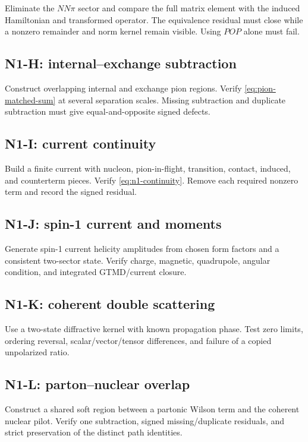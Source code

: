 \documentclass[11pt]{article}
\begin{document}
Eliminate the \(NN\pi\) sector and compare the full matrix element with the
induced Hamiltonian and transformed operator.  The equivalence residual must
close while a nonzero remainder and norm kernel remain visible.  Using
\(POP\) alone must fail.

\subsection{N1-H: internal--exchange subtraction}

Construct overlapping internal and exchange pion regions.  Verify
\cref{eq:pion-matched-sum} at several separation scales.  Missing subtraction
and duplicate subtraction must give equal-and-opposite signed defects.

\subsection{N1-I: current continuity}

Build a finite current with nucleon, pion-in-flight, transition, contact,
induced, and counterterm pieces.  Verify \cref{eq:n1-continuity}.  Remove each
required nonzero term and record the signed residual.

\subsection{N1-J: spin-1 current and moments}

Generate spin-1 current helicity amplitudes from chosen form factors and a
consistent two-sector state.  Verify charge, magnetic, quadrupole, angular
condition, and integrated GTMD/current closure.

\subsection{N1-K: coherent double scattering}

Use a two-state diffractive kernel with known propagation phase.  Test zero
limits, ordering reversal, scalar/vector/tensor differences, and failure of a
copied unpolarized ratio.

\subsection{N1-L: parton--nuclear overlap}

Construct a shared soft region between a partonic Wilson term and the coherent
nuclear pilot.  Verify one subtraction, signed missing/duplicate residuals,
and strict preservation of the distinct path identities.
\end{document}
